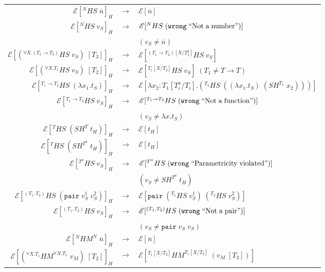 \begin{figure}
\onehalfspacing
\begin{center}
\begin{tabular}{rcl}
$\mathscr{E}[^{N}HS\;\overline{n}]_{H}$ & $\rightarrow$ & $\mathscr{E}[\overline{n}]$ \\
$\mathscr{E}[^{N}HS\;v_{S}]_{H}$ & $\rightarrow$ & $\mathscr{E}[^{N}HS\;(\mathtt{wrong}\;\mathrm{``Not\;a\;number"})]$ \\
&& $(v_{S}\neq\overline{n})$ \\
$\mathscr{E}[(^{\forall X.(T_{1}\rightarrow T_{2})}HS\;v_{S})\;[T_{3}]]_{H}$ & $\rightarrow$ & $\mathscr{E}[^{(T_{1}\rightarrow T_{2})[X/T^{a}_{3}]}HS\;v_{S}]$ \\
$\mathscr{E}[(^{\forall X.T_{1}}HS\;v_{S})\;[T_{2}]]_{H}$ & $\rightarrow$ & $\mathscr{E}[^{T_{1}[X/T_{2}]}HS\;v_{S}]\;(T_{1}\neq T\rightarrow T)$ \\
$\mathscr{E}[^{T_{1}\rightarrow T_{2}}HS\;(\lambda x_{1}.t_{S})]_{H}$ & $\rightarrow$ & $\mathscr{E}[\lambda x_{2}:T_{1}[T^{a}_{i}/T_{i}].(^{T_{2}}HS\;((\lambda x_{1}.t_{S})\;(SH^{T_{1}}\;x_{2})))]$ \\
$\mathscr{E}[^{T_{1}\rightarrow T_{2}}HS\;v_{S}]_{H}$ & $\rightarrow$ & $\mathscr{E}[^{T_{1}\rightarrow T_{2}}HS\;(\mathtt{wrong}\;\mathrm{``Not\;a\;function"})]$ \\
&& $(v_{S}\neq\lambda x.t_{S})$ \\
$\mathscr{E}[^{T}HS\;(SH^{T}\;t_{H})]_{H}$ & $\rightarrow$ & $\mathscr{E}[t_{H}]$ \\
$\mathscr{E}[^{T}HS\;(SH^{T^{a}}\;t_{H})]_{H}$ & $\rightarrow$ & $\mathscr{E}[t_{H}]$ \\
$\mathscr{E}[^{T^{a}}HS\;v_{S}]_{H}$ & $\rightarrow$ & $\mathscr{E}[^{T^{a}}HS\;(\mathtt{wrong}\;\mathrm{``Parametricity\;violated"})]$ \\
&& $(v_{S}\neq SH^{T^{a}}\;t_{H})$ \\
$\mathscr{E}[^{(T_{1},T_{2})}HS\;(\mathtt{pair}\;v_{S}^{1}\;v_{S}^{2})]_{H}$ & $\rightarrow$ & $\mathscr{E}[\mathtt{pair}\;(^{T_{1}}HS\;v_{S}^{1})\;(^{T_{2}}HS\;v_{S}^{2})]$ \\
$\mathscr{E}[^{(T_{1},T_{2})}HS\;v_{S}]_{H}$ & $\rightarrow$ & $\mathscr{E}[^{(T_{1},T_{2})}HS\;(\mathtt{wrong}\;\mathrm{``Not\;a\;pair"})]$ \\
&& $(v_{S}\neq\mathtt{pair}\;v_{S}\;v_{S})$ \\
$\mathscr{E}[^{N}HM^{N}\;\overline{n}]_{H}$ & $\rightarrow$ & $\mathscr{E}[\overline{n}]$ \\
$\mathscr{E}[(^{\forall X.T_{1}}HM^{\forall X.T_{1}}\;v_{M})\;[T_{2}]]_{H}$ & $\rightarrow$ & $\mathscr{E}[^{T_{1}[X/T_{2}]}HM^{T_{1}[X/T_{2}]}\;(v_{M}\;[T_{2}])]$ \\

\end{tabular}
\end{center}
\end{figure}
